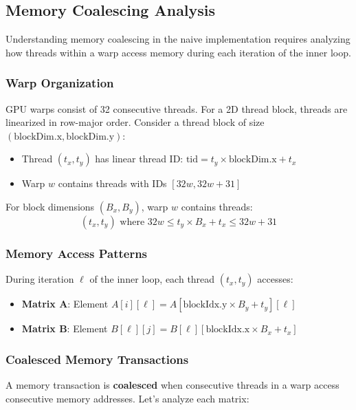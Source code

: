 \documentclass{amsbook}
\theoremstyle{definition}
\begin{document}
\subsection{Memory Coalescing Analysis}

Understanding memory coalescing in the naive implementation requires analyzing how threads within a warp access memory during each iteration of the inner loop.

\subsubsection{Warp Organization}

GPU warps consist of 32 consecutive threads. For a 2D thread block, threads are linearized in row-major order. Consider a thread block of size $(\text{blockDim.x}, \text{blockDim.y})$:

\begin{itemize}
\item Thread $(t_x, t_y)$ has linear thread ID: $\text{tid} = t_y \times \text{blockDim.x} + t_x$
\item Warp $w$ contains threads with IDs $[32w, 32w+31]$
\end{itemize}

For block dimensions $(B_x, B_y)$, warp $w$ contains threads:
\begin{equation}
(t_x, t_y) \text{ where } 32w \leq t_y \times B_x + t_x \leq 32w + 31
\end{equation}

\subsubsection{Memory Access Patterns}

During iteration $\ell$ of the inner loop, each thread $(t_x, t_y)$ accesses:
\begin{itemize}
\item \textbf{Matrix A}: Element $A[i][\ell] = A[\text{blockIdx.y} \times B_y + t_y][\ell]$
\item \textbf{Matrix B}: Element $B[\ell][j] = B[\ell][\text{blockIdx.x} \times B_x + t_x]$
\end{itemize}

\subsubsection{Coalesced Memory Transactions}

A memory transaction is \textbf{coalesced} when consecutive threads in a warp access consecutive memory addresses. Let's analyze each matrix:
\end{document}
